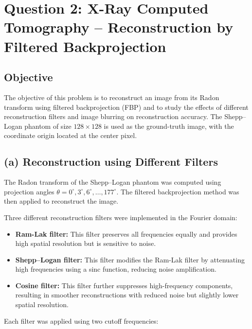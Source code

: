 \documentclass[11pt,a4paper]{article}
\begin{document}
\section*{Question 2: X-Ray Computed Tomography -- Reconstruction by Filtered Backprojection}

\subsection*{Objective}

The objective of this problem is to reconstruct an image from its Radon transform using filtered backprojection (FBP) and to study the effects of different reconstruction filters and image blurring on reconstruction accuracy. The Shepp--Logan phantom of size $128 \times 128$ is used as the ground-truth image, with the coordinate origin located at the center pixel.

\subsection*{(a) Reconstruction using Different Filters}

The Radon transform of the Shepp--Logan phantom was computed using projection angles $\theta = 0^\circ, 3^\circ, 6^\circ, \ldots, 177^\circ$. The filtered backprojection method was then applied to reconstruct the image.

Three different reconstruction filters were implemented in the Fourier domain:

\begin{itemize}
\item \textbf{Ram-Lak filter:} This filter preserves all frequencies equally and provides high spatial resolution but is sensitive to noise.
\item \textbf{Shepp--Logan filter:} This filter modifies the Ram-Lak filter by attenuating high frequencies using a sinc function, reducing noise amplification.
\item \textbf{Cosine filter:} This filter further suppresses high-frequency components, resulting in smoother reconstructions with reduced noise but slightly lower spatial resolution.
\end{itemize}

Each filter was applied using two cutoff frequencies:
\end{document}
